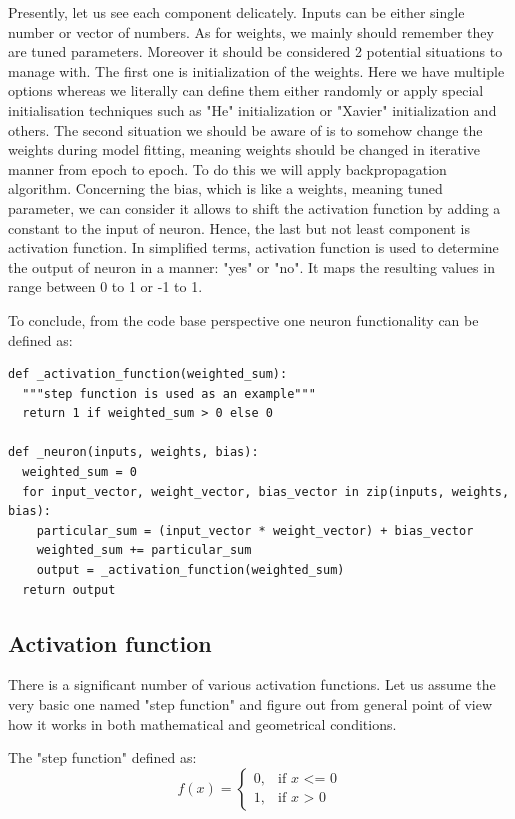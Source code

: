 Presently, let us see each component delicately.
Inputs can be either single number or vector of numbers. As for weights, we mainly should remember they are tuned parameters. Moreover it should be considered 2 potential situations to manage with. The first one is initialization of the weights. Here we have multiple options whereas we literally can define them either randomly or apply special initialisation techniques such as "He" initialization or "Xavier" initialization and others. The second situation we should be aware of is to somehow change the weights during model fitting, meaning weights should be changed in iterative manner from epoch to epoch. To do this we will apply backpropagation algorithm. Concerning the bias, which is like a weights, meaning tuned parameter, we can consider it allows to shift the activation function by adding a constant to the input of neuron. Hence, the last but not least component is activation function. In simplified terms, activation function is used to determine the output of neuron in a manner: "yes" or "no". It maps the resulting values in range between 0 to 1 or -1 to 1.            

To conclude, from the code base perspective one neuron functionality can be defined as:
\begin{lstlisting}
def _activation_function(weighted_sum):
  """step function is used as an example"""
  return 1 if weighted_sum > 0 else 0

def _neuron(inputs, weights, bias):
  weighted_sum = 0
  for input_vector, weight_vector, bias_vector in zip(inputs, weights, bias):
    particular_sum = (input_vector * weight_vector) + bias_vector
    weighted_sum += particular_sum
    output = _activation_function(weighted_sum)
  return output
\end{lstlisting}

      
\subsection{Activation function}
There is a significant number of various activation functions. Let us assume the very basic one named "step function" and figure out from general point of view how it works in both mathematical and geometrical conditions.   

The "step function" defined as:
\[ f(x) = \begin{cases} 0, & \mbox{if } x\mbox{ <= 0} \\ 1, & \mbox{if } x\mbox{ > 0} \end{cases} \]

